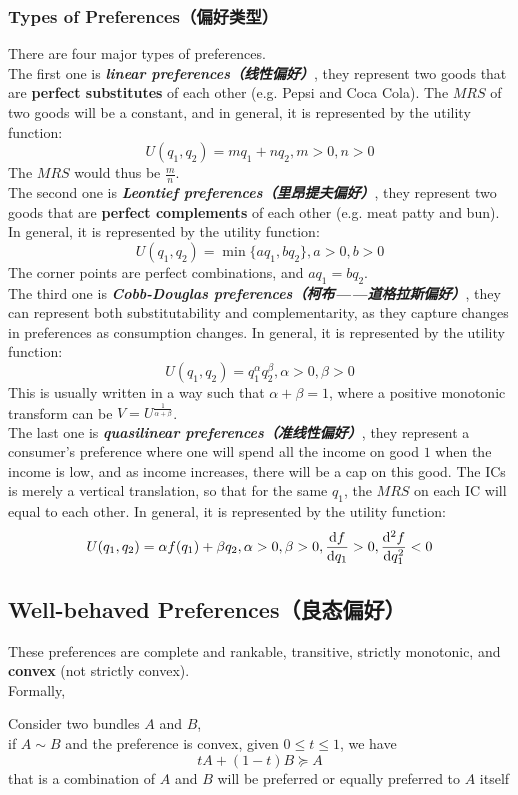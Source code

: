 \subsubsection{Types of Preferences（偏好类型）}
There are four major types of preferences. \\
The first one is \textbf{\textit{linear preferences（线性偏好）}}, they represent two goods that are \textbf{perfect substitutes} of each other (e.g. Pepsi and Coca Cola). The $MRS$ of two goods will be a constant, and in general, it is represented by the utility function:
$$U(q_1, q_2) = mq_1 + nq_2, m > 0, n > 0$$
The $MRS$ would thus be $\frac{m}{n}$. \\
The second one is \textbf{\textit{Leontief preferences（里昂提夫偏好）}}, they represent two goods that are \textbf{perfect complements} of each other (e.g. meat patty and bun). In general, it is represented by the utility function:
$$U(q_1, q_2) = \min{\{aq_1, bq_2\}}, a > 0, b > 0$$
The corner points are perfect combinations, and $aq_1 = bq_2$. \\
The third one is \textbf{\textit{Cobb-Douglas preferences（柯布——道格拉斯偏好）}}, they can represent both substitutability and complementarity, as they capture changes in preferences as consumption changes. In general, it is represented by the utility function:
$$U(q_1, q_2) = q_1^\alpha q_2^\beta, \alpha > 0, \beta > 0$$
This is usually written in a way such that $\alpha + \beta = 1$, where a positive monotonic transform can be $V = U^{\frac{1}{\alpha + \beta}}$. \\
The last one is \textbf{\textit{quasilinear preferences（准线性偏好）}}, they represent a consumer's preference where one will spend all the income on good $1$ when the income is low, and as income increases, there will be a cap on this good. The ICs is merely a vertical translation, so that for the same $q_1$, the $MRS$ on each IC will equal to each other. In general, it is represented by the utility function:
$$U(q_1, q_2) = \alpha f(q_1) + \beta q_2, \alpha > 0, \beta > 0, \dv{f}{q_1} > 0, \dv[2]{f}{q_1} < 0$$

\subsection{Well-behaved Preferences（良态偏好）}
These preferences are complete and rankable, transitive, strictly monotonic, and \textbf{convex} (not strictly convex). \\
Formally,
\begin{definition}
    Consider two bundles $A$ and $B$, \\
    if $A \sim B$ and the preference is convex, given $0 \le t \le 1$, we have
    $$tA + (1-t)B \succeq A$$
    that is a combination of $A$ and $B$ will be preferred or equally preferred to $A$ itself
\end{definition}

